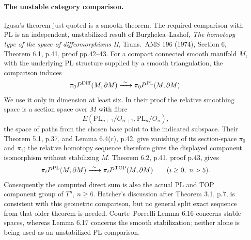 \paragraph{The unstable category comparison.}
Igusa's theorem just quoted is a smooth theorem.  The required
comparison with PL is an independent, unstabilized result of
Burghelea--Lashof, \emph{The homotopy type of the space of
diffeomorphisms II}, Trans.\ AMS 196 (1974), Section 6,
Theorem 6.1, p.41, proof pp.42--43.  For a compact connected smooth
manifold $M$, with the underlying PL structure supplied by a smooth
triangulation, the comparison induces
\[
 \pi_0P^{\rm Diff}(M,\partial M)
       \xrightarrow{\ \sim\ }
 \pi_0P^{\rm PL}(M,\partial M).
\]
We use it only in dimension at least six.  In their proof the
relative smoothing space is a section space over $M$ with fibre
\[
 E(\mathrm{PL}_{n+1}/O_{n+1},\mathrm{PL}_n/O_n),
\]
the space of paths from the chosen base point to the indicated
subspace.  Their Theorem 5.1, p.37, and Lemma 6.4(c), p.42,
give vanishing of its section-space $\pi_0$ and $\pi_1$;
the relative homotopy sequence therefore gives the displayed
component isomorphism without stabilizing $M$.
Theorem 6.2, p.41, proof p.43, gives
\[
 \pi_iP^{\rm PL}(M,\partial M)
       \xrightarrow{\ \sim\ }
 \pi_iP^{\rm TOP}(M,\partial M)\qquad(i\geq0,\ n>5).
\]
Consequently the computed direct sum is also the actual PL and
TOP component group of $T^n$, $n\geq6$.
Hatcher's discussion after Theorem 3.1, p.7, is consistent with this
geometric comparison, but no general split exact sequence from that
older theorem is needed.  Courte--Porcelli Lemma 6.16 concerns
stable spaces, whereas Lemma 6.17 concerns the smooth stabilization;
neither alone is being used as an unstabilized PL comparison.
